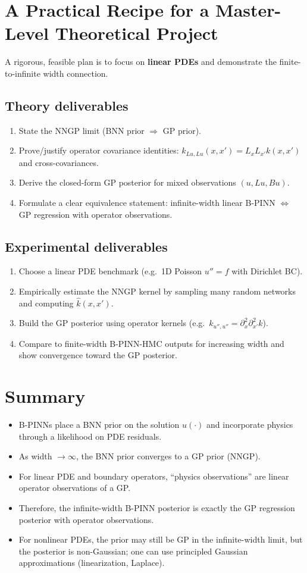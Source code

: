 \documentclass[11pt]{article}
\begin{document}
\section{A Practical Recipe for a Master-Level Theoretical Project}

A rigorous, feasible plan is to focus on \textbf{linear PDEs} and demonstrate the finite-to-infinite width connection.

\subsection*{Theory deliverables}
\begin{enumerate}
\item State the NNGP limit (BNN prior $\Rightarrow$ GP prior).
\item Prove/justify operator covariance identities: $k_{Lu,Lu}(x,x')=L_xL_{x'}k(x,x')$ and cross-covariances.
\item Derive the closed-form GP posterior for mixed observations $(u,Lu,Bu)$.
\item Formulate a clear equivalence statement: infinite-width linear B-PINN $\Leftrightarrow$ GP regression with operator observations.
\end{enumerate}

\subsection*{Experimental deliverables}
\begin{enumerate}
\item Choose a linear PDE benchmark (e.g.\ 1D Poisson $u''=f$ with Dirichlet BC).
\item Empirically estimate the NNGP kernel by sampling many random networks and computing $\hat k(x,x')$.
\item Build the GP posterior using operator kernels (e.g.\ $k_{u'',u''}=\partial_x^2\partial_{x'}^2 k$).
\item Compare to finite-width B-PINN-HMC outputs for increasing width and show convergence toward the GP posterior.
\end{enumerate}

\section{Summary}

\begin{itemize}
\item B-PINNs place a BNN prior on the solution $u(\cdot)$ and incorporate physics through a likelihood on PDE residuals.
\item As width $\to\infty$, the BNN prior converges to a GP prior (NNGP).
\item For linear PDE and boundary operators, ``physics observations'' are linear operator observations of a GP.
\item Therefore, the infinite-width B-PINN posterior is exactly the GP regression posterior with operator observations.
\item For nonlinear PDEs, the prior may still be GP in the infinite-width limit, but the posterior is non-Gaussian; one can use principled Gaussian approximations (linearization, Laplace).
\end{itemize}
\end{document}
